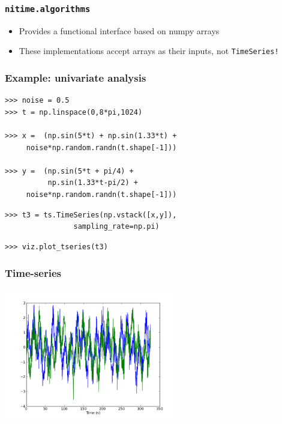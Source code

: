 \documentclass{beamer}
\begin{document}
\begin{frame}
\frametitle{\tt{nitime.algorithms}}
\begin{itemize}
\pause
\item
Provides a functional interface based on numpy arrays
\pause
\item
These implementations accept arrays as their inputs, not \tt{TimeSeries}!
\end{itemize}
\end{frame}

\begin{frame}[fragile]
\frametitle{Example: univariate analysis}
\pause
\begin{lstlisting}
>>> noise = 0.5
>>> t = np.linspace(0,8*pi,1024) 

>>> x =  (np.sin(5*t) + np.sin(1.33*t) +  
     noise*np.random.randn(t.shape[-1]))

>>> y =  (np.sin(5*t + pi/4) + 
          np.sin(1.33*t-pi/2) +
     noise*np.random.randn(t.shape[-1]))
\end{lstlisting}

\pause
\begin{lstlisting}
>>> t3 = ts.TimeSeries(np.vstack([x,y]),
                sampling_rate=np.pi)
\end{lstlisting}

\pause
\begin{lstlisting}
>>> viz.plot_tseries(t3)
\end{lstlisting}
\end{frame}

\begin{frame}
\frametitle{Time-series}
\includegraphics[height=5.7cm]{figures/outa_phase_tseries}
\end{frame}
\end{document}
